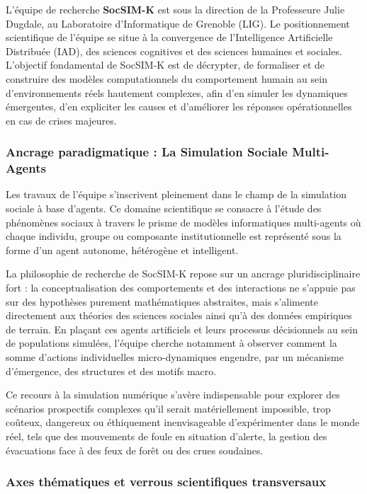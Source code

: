 \documentclass{article}
\begin{document}
L'équipe de recherche \textbf{SocSIM-K} est sous la direction de la Professeure Julie Dugdale, au Laboratoire d'Informatique de Grenoble (LIG). Le positionnement scientifique de l'équipe se situe à la convergence de l'Intelligence Artificielle Distribuée (IAD), des sciences cognitives et des sciences humaines et sociales. L'objectif fondamental de SocSIM-K est de décrypter, de formaliser et de construire des modèles computationnels du comportement humain au sein d'environnements réels hautement complexes, afin d'en simuler les dynamiques émergentes, d'en expliciter les causes et d'améliorer les réponses opérationnelles en cas de crises majeures.

\subsubsection{Ancrage paradigmatique : La Simulation Sociale Multi-Agents}

Les travaux de l'équipe s'inscrivent pleinement dans le champ de la simulation sociale à base d'agents. Ce domaine scientifique se consacre à l'étude des phénomènes sociaux à travers le prisme de modèles informatiques multi-agents où chaque individu, groupe ou composante institutionnelle est représenté sous la forme d'un agent autonome, hétérogène et intelligent. 

La philosophie de recherche de SocSIM-K repose sur un ancrage pluridisciplinaire fort : la conceptualisation des comportements et des interactions ne s'appuie pas sur des hypothèses purement mathématiques abstraites, mais s'alimente directement aux théories des sciences sociales ainsi qu'à des données empiriques de terrain. En plaçant ces agents artificiels et leurs processus décisionnels au sein de populations simulées, l'équipe cherche notamment à observer comment la somme d'actions individuelles micro-dynamiques engendre, par un mécanisme d'émergence, des structures et des motifs macro. 

Ce recours à la simulation numérique s'avère indispensable pour explorer des scénarios prospectifs complexes qu'il serait matériellement impossible, trop coûteux, dangereux ou éthiquement inenvisageable d'expérimenter dans le monde réel, tels que des mouvements de foule en situation d'alerte, la gestion des évacuations face à des feux de forêt ou des crues soudaines.

\subsubsection{Axes thématiques et verrous scientifiques transversaux}
\end{document}
